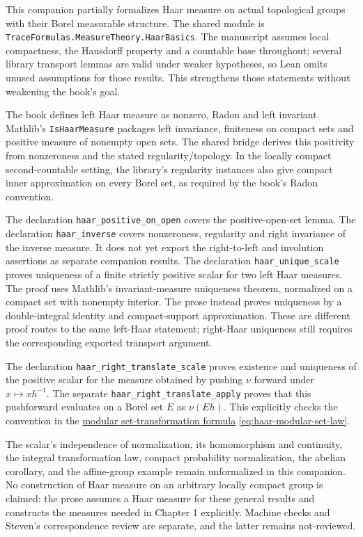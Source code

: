This companion partially formalizes Haar measure on actual topological groups with their Borel measurable structure. The shared module is \texttt{TraceFormulas.MeasureTheory.HaarBasics}. The manuscript assumes local compactness, the Hausdorff property and a countable base throughout; several library transport lemmas are valid under weaker hypotheses, so Lean omits unused assumptions for those results. This strengthens those statements without weakening the book's goal.

The book defines left Haar measure as nonzero, Radon and left invariant. Mathlib's \texttt{IsHaarMeasure} packages left invariance, finiteness on compact sets and positive measure of nonempty open sets. The shared bridge derives this positivity from nonzeroness and the stated regularity/topology. In the locally compact second-countable setting, the library's regularity instances also give compact inner approximation on every Borel set, as required by the book's Radon convention.

The declaration \texttt{haar\_positive\_on\_open} covers the positive-open-set lemma. The declaration \texttt{haar\_inverse} covers nonzeroness, regularity and right invariance of the inverse measure. It does not yet export the right-to-left and involution assertions as separate companion results. The declaration \texttt{haar\_unique\_scale} proves uniqueness of a finite strictly positive scalar for two left Haar measures. The proof uses Mathlib's invariant-measure uniqueness theorem, normalized on a compact set with nonempty interior. The prose instead proves uniqueness by a double-integral identity and compact-support approximation. These are different proof routes to the same left-Haar statement; right-Haar uniqueness still requires the corresponding exported transport argument.

The declaration \texttt{haar\_right\_translate\_scale} proves existence and uniqueness of the positive scalar for the measure obtained by pushing $\nu$ forward under $x\mapsto xh^{-1}$. The separate \texttt{haar\_right\_translate\_apply} proves that this pushforward evaluates on a Borel set $E$ as $\nu(Eh)$. This explicitly checks the convention in the \hyperref[eq:haar-modular-set-law]{modular set-transformation formula} \eqref{eq:haar-modular-set-law}.

The scalar's independence of normalization, its homomorphism and continuity, the integral transformation law, compact probability normalization, the abelian corollary, and the affine-group example remain unformalized in this companion. No construction of Haar measure on an arbitrary locally compact group is claimed: the prose assumes a Haar measure for these general results and constructs the measures needed in Chapter 1 explicitly. Machine checks and Steven's correspondence review are separate, and the latter remains not-reviewed.
